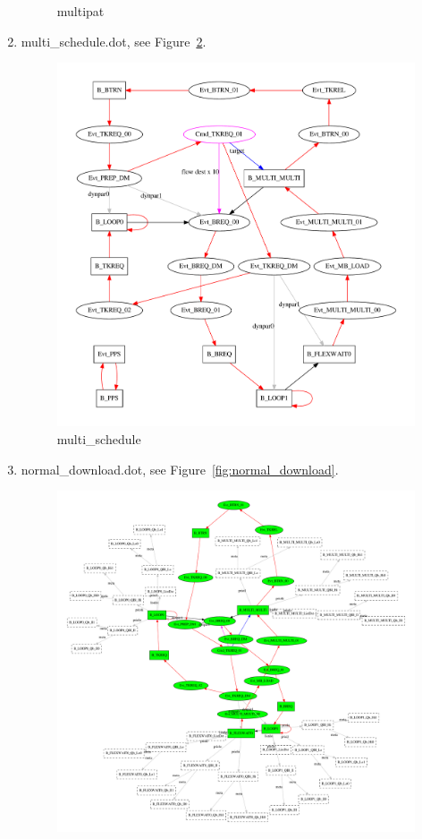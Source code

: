 \documentclass[12pt,a4paper]{report}
\begin{document}
\begin{enumerate}
\begin{figure}
        \caption{multipat}
        \label{fig:multipat}
    \end{figure}
\item multi\_schedule.dot, see Figure~\ref{fig:multi_schedule}.
    \begin{figure}
        \centering
        \includegraphics*[width=1.0\textwidth,keepaspectratio]{TestPattern/multi_schedule.pdf}
        \caption{multi\_schedule}
        \label{fig:multi_schedule}
    \end{figure}
\item normal\_download.dot, see Figure~\ref{fig:normal_download}.
    \begin{figure}
        \centering
        \includegraphics*[width=1.0\textwidth,keepaspectratio]{TestPattern/normal_download.pdf}

\end{figure}
\end{enumerate}
\end{document}
